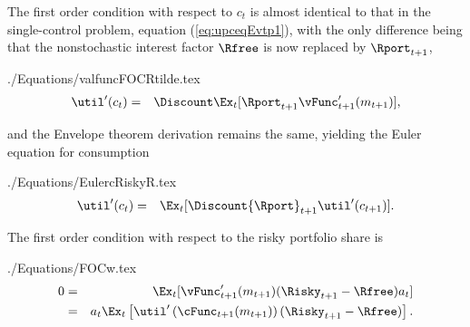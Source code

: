 \documentclass[titlepage]{\econtex}
\begin{document}
The first order condition with respect to ${c}_{t}$ is almost identical
to that in the single-control problem, equation (\ref{eq:upceqEvtp1}),
with the only difference being that the nonstochastic interest factor
$\Rfree$ is now replaced by ${\Rport}_{t+1}$,
\begin{verbatimwrite}{./Equations/valfuncFOCRtilde.tex}
\begin{eqnarray}
        \util^{\prime}({c}_{t}) & = & \Discount \Ex_{t} [{\Rport}_{t+1} \vFunc^{\prime}_{t+1}({m}_{t+1})] \label{eq:valfuncFOCRtilde},
\end{eqnarray}
\end{verbatimwrite}

and the Envelope theorem derivation remains the same, 
yielding the Euler equation for consumption
\begin{verbatimwrite}{./Equations/EulercRiskyR.tex}
\begin{eqnarray}
        \util^{\prime}({c}_{t}) & = & \Ex_{t}[\Discount {\Rport}_{t+1} \util^{\prime}({c}_{t+1})]. \label{eq:EulercRiskyR}
\end{eqnarray}
\end{verbatimwrite}


The first order condition with respect to the risky portfolio share is
\begin{verbatimwrite}{./Equations/FOCw.tex}
\begin{eqnarray}
        0 & = & \Ex_{t}[{\vFunc}_{t+1}^{\prime}({m}_{t+1})(\Risky_{t+1}-\Rfree){a}_{t}] \notag
\\        & = & {a}_{t}\Ex_{t}\left[\util^{\prime}\left(\cFunc_{t+1}({m}_{t+1})\right)(\Risky_{t+1}-\Rfree)\right] \label{eq:FOCw}.
\end{eqnarray}
\end{verbatimwrite}

\end{document}
